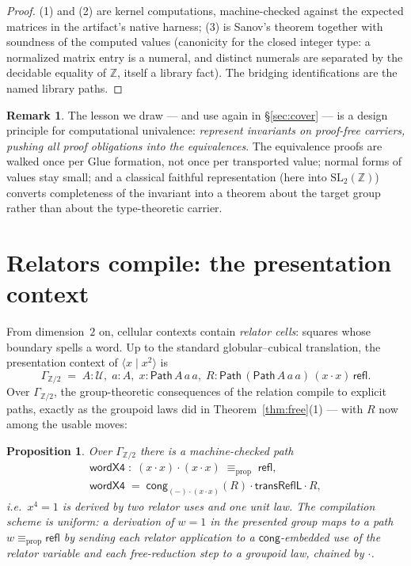 \documentclass[11pt]{amsart}
\newtheorem{prop}[thm]{Proposition}
\theoremstyle{definition}
\newtheorem{rem}[thm]{Remark}
\newcommand{\propeq}{\equiv_{\mathrm{prop}}}
\newcommand{\refl}{\mathsf{refl}}
\newcommand{\Path}{\mathsf{Path}}
\newcommand{\U}{\mathcal{U}}
\newcommand{\cng}{\mathsf{cong}}
\newcommand{\trns}{\mathbin{\cdot}}
\newcommand{\SL}{\mathrm{SL}_2(\mathbb{Z})}
\begin{document}
\begin{proof}
  (1) and (2) are kernel computations, machine-checked against the
  expected matrices in the artifact's native harness; (3) is
  Sanov's theorem \cite{Sanov} together with soundness of the
  computed values (canonicity for the closed integer type: a
  normalized matrix entry is a numeral, and distinct numerals are
  separated by the decidable equality of $\mathbb{Z}$, itself a
  library fact).  The bridging identifications are the named
  library paths.
\end{proof}

\begin{rem}
  The lesson we draw --- and use again in \S\ref{sec:cover} --- is a
  design principle for computational univalence:
  \emph{represent invariants on proof-free carriers, pushing all
  proof obligations into the equivalences}.  The equivalence proofs
  are walked once per Glue formation, not once per transported
  value; normal forms of values stay small; and a classical
  faithful representation (here into $\SL$) converts completeness of
  the invariant into a theorem about the target group rather than
  about the type-theoretic carrier.
\end{rem}

\section{Relators compile: the presentation context}
\label{sec:relators}

From dimension~$2$ on, cellular contexts contain \emph{relator
cells}: squares whose boundary spells a word.  Up to the standard
globular--cubical translation, the presentation context of
$\langle x \mid x^2 \rangle$ is
\[
  \Gamma_{\mathbb{Z}/2}
  \;=\;
  A : \U,\;
  a : A,\;
  x : \Path\,A\,a\,a,\;
  R : \Path\,(\Path\,A\,a\,a)\,(x \trns x)\,\refl .
\]
Over $\Gamma_{\mathbb{Z}/2}$, the group-theoretic consequences of
the relation compile to explicit paths, exactly as the groupoid
laws did in Theorem~\ref{thm:free}(1) --- with $R$ now among the
usable moves:

\begin{prop}
  \label{prop:compile}
  Over $\Gamma_{\mathbb{Z}/2}$ there is a machine-checked path
  \begin{gather*}
    \mathsf{wordX4}
    \;:\;
    (x \trns x) \trns (x \trns x) \;\propeq\; \refl,\\
    \mathsf{wordX4}
    \;=\;
    \cng_{(-)\trns(x\trns x)}(R)
    \trns \mathsf{transReflL}
    \trns R ,
  \end{gather*}
  i.e.\ $x^4 = 1$ is derived by two relator uses and one unit law.
  The compilation scheme is uniform: a derivation of $w = 1$ in the
  presented group maps to a path $w \propeq \refl$ by sending each
  relator application to a $\cng$-embedded use of the relator
  variable and each free-reduction step to a groupoid law, chained
  by $\trns$.
\end{prop}
\end{document}
